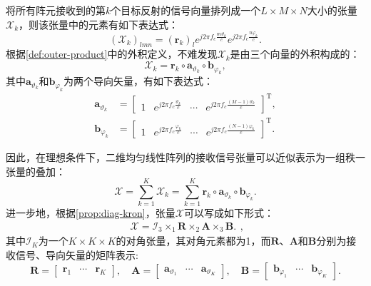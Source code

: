 将所有阵元接收到的第\( k \)个目标反射的信号向量排列成一个\( L \times M \times N \)大小的张量\( \mathcal{X}_k \)，则该张量中的元素有如下表达式：
\[
    \left( \mathcal{X}_k \right)_{lmn} = \left( \bm{r}_k \right)_l e^{j 2 \pi f_c \frac{m \vartheta_k}{c}} e^{j 2 \pi f_c \frac{n \varphi_k}{c}}.
\]
根据\cref{def:outer-product}中的外积定义，不难发现\( \mathcal{X}_k \)是由三个向量的外积构成的：
\[
    \mathcal{X}_k = \bm{r}_k \circ \bm{a}_{\vartheta_k} \circ \bm{b}_{\varphi_k},
\]
其中\( \bm{a}_{\vartheta_k} \)和\( \bm{b}_{\varphi_k} \)为两个导向矢量，有如下表达式：
\[
    \begin{split}
        \bm{a}_{\vartheta_k} & = \begin{bmatrix}
                                     1 & e^{j 2 \pi f_c \frac{\vartheta_k}{c}} & \cdots & e^{j 2 \pi f_c \frac{(M-1) \vartheta_k}{c}}
                                 \end{bmatrix}^{\mathrm{T}}, \\
        \bm{b}_{\varphi_k}   & = \begin{bmatrix}
                                     1 & e^{j 2 \pi f_c \frac{\varphi_k}{c}} & \cdots & e^{j 2 \pi f_c \frac{(N-1) \varphi_k}{c}}
                                 \end{bmatrix}^{\mathrm{T}}.
    \end{split}
\]

因此，在理想条件下，二维均匀线性阵列的接收信号张量可以近似表示为一组秩一张量的叠加：
\[
    \mathcal{X}
    = \sum_{k=1}^{K} \mathcal{X}_k
    = \sum_{k=1}^{K} \bm{r}_k \circ \bm{a}_{\vartheta_k} \circ \bm{b}_{\varphi_k}.
\]
进一步地，根据\cref{prop:diag-kron}，张量\( \mathcal{X} \)可以写成如下形式：
\[
    \begin{split}
        \mathcal{X} = \mathcal{I}_3 \times_1 \mathbf{R} \times_2 \mathbf{A} \times_3 \mathbf{B}.
    \end{split},
\]
其中\( \mathcal{I}_K \)为一个\( K \times K \times K \)的对角张量，其对角元素都为1，而\( \mathbf{R} \)、\( \mathbf{A} \)和\( \mathbf{B} \)分别为接收信号、导向矢量的矩阵表示:
\[
    \mathbf{R} = \begin{bmatrix}
        \bm{r}_1 & \cdots & \bm{r}_K
    \end{bmatrix}, \quad
    \mathbf{A} = \begin{bmatrix}
        \bm{a}_{\vartheta_1} & \cdots & \bm{a}_{\vartheta_K}
    \end{bmatrix}, \quad
    \mathbf{B} = \begin{bmatrix}
        \bm{b}_{\varphi_1} & \cdots & \bm{b}_{\varphi_K}
    \end{bmatrix}.
\]

